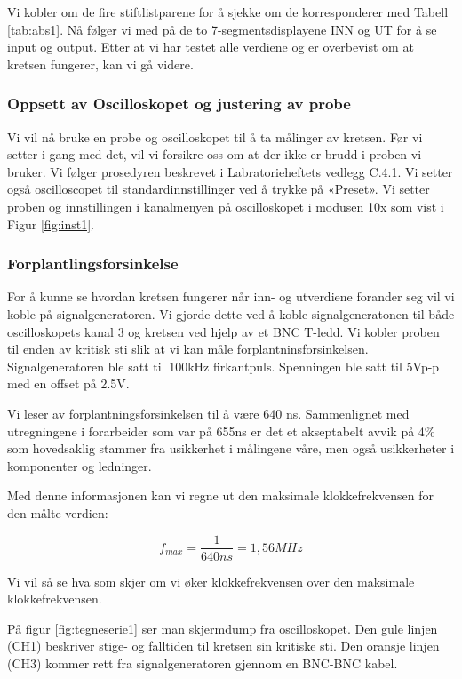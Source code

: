 \documentclass{article}
\begin{document}
Vi kobler om de fire stiftlistparene for å sjekke om de korresponderer med Tabell \ref{tab:abs1}. Nå følger vi med på de to 7-segmentsdisplayene INN og UT for å se input og output. Etter at vi har testet alle verdiene og er overbevist om at kretsen fungerer, kan vi gå videre. 








\newpage
\subsubsection{Oppsett av Oscilloskopet og justering av probe}
Vi vil nå bruke en probe og oscilloskopet til å ta målinger av kretsen. Før vi setter i gang med det, vil vi forsikre oss om at der ikke er brudd i proben vi bruker. Vi følger prosedyren beskrevet i Labratorieheftets vedlegg C.4.1. Vi setter også oscilloscopet til standardinnstillinger ved å trykke på «Preset». Vi setter proben og innstillingen i kanalmenyen på oscilloskopet i modusen 10x som vist i Figur \ref{fig:inst1}.

\subsubsection{Forplantlingsforsinkelse}
For å kunne se hvordan kretsen fungerer når inn- og utverdiene forander seg vil vi koble på signalgeneratoren. Vi gjorde dette ved å koble signalgeneratonen til både oscilloskopets kanal 3 og kretsen ved hjelp av et BNC T-ledd. Vi kobler proben til enden av kritisk sti slik at vi kan måle forplantninsforsinkelsen. Signalgeneratoren ble satt til 100kHz firkantpuls. Spenningen ble satt til 5Vp-p med en offset på 2.5V.

Vi leser av forplantningsforsinkelsen til å være 640 ns. Sammenlignet med utregningene i forarbeider som var på 655ns er det et akseptabelt avvik på 4\% som hovedsaklig stammer fra usikkerhet i målingene våre, men også usikkerheter i komponenter og ledninger.

Med denne informasjonen kan vi regne ut den maksimale klokkefrekvensen for den målte verdien:

\begin{equation}
	f_{max} = \frac{1}{640ns} = 1,56 MHz
\end{equation}

Vi vil så se hva som skjer om vi øker klokkefrekvensen over den maksimale klokkefrekvensen.


På figur \ref{fig:tegneserie1} ser man skjermdump fra oscilloskopet. Den gule linjen (CH1) beskriver stige- og falltiden til kretsen sin kritiske sti. Den oransje linjen (CH3) kommer rett fra signalgeneratoren gjennom en BNC-BNC kabel.
\end{document}
